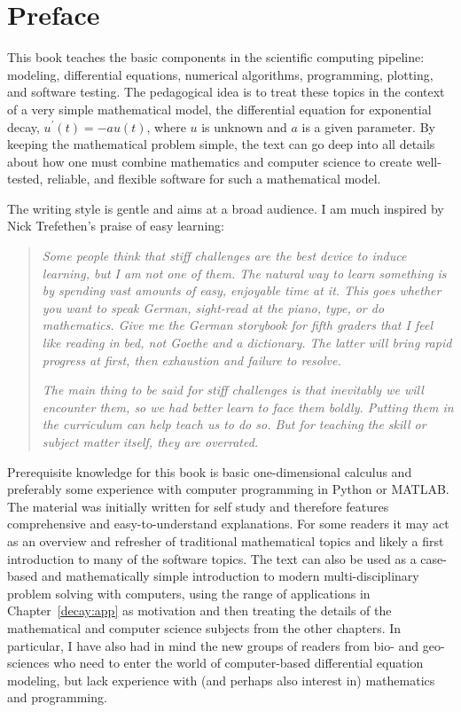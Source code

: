 \documentclass[graybox,sectrefs,envcountresetchap,open=right,final]{svmonodo}
\begin{document}
\setpagesize

\chapter*{Preface}
\label{ch:preface}

This book teaches the basic components in the scientific
computing pipeline: modeling, differential equations, numerical
algorithms, programming, plotting, and software testing. The pedagogical idea
is to treat these topics in the context of a very simple
mathematical model, the
differential equation for exponential decay, $u^{\prime}(t)=-au(t)$,
where $u$ is unknown and $a$ is a given parameter. By keeping the
mathematical problem simple, the text can go deep into all details
about how one must combine mathematics and computer science to
create well-tested, reliable, and flexible software for such a
mathematical model.

The writing style is gentle and aims at a broad audience. I am much
inspired by Nick Trefethen's praise of easy learning:


\begin{quote}
\emph{Some people think that stiff challenges are the best device to
induce learning, but I am not one of them. The natural way to learn
something is by spending vast amounts of easy, enjoyable time at it.
This goes whether you want to speak German, sight-read at the
piano, type, or do mathematics. Give me the German storybook for
fifth graders that I feel like reading in bed, not Goethe and a
dictionary. The latter will bring rapid progress at first, then
exhaustion and failure to resolve.}

\emph{The main thing to be said for stiff challenges is that inevitably
we will encounter them, so we had better learn to face them boldly.
Putting them in the curriculum can help teach us to do so. But for
teaching the skill or subject matter itself, they are overrated.}
\cite[p.~86]{index_cards}
\end{quote}


Prerequisite knowledge for this book is basic one-dimensional calculus
and preferably some experience with computer programming in Python or
MATLAB.  The material was initially written for self study and
therefore features comprehensive and easy-to-understand
explanations. For some readers it may act as an overview and refresher
of traditional mathematical topics and likely a first introduction to
many of the software topics. The text can also be used as a case-based
and mathematically simple introduction to modern multi-disciplinary
problem solving with computers, using the range of applications in
Chapter~\ref{decay:app} as motivation and then treating the details of
the mathematical and computer science subjects from the other
chapters. In particular, I have also had in mind the new groups of
readers from bio- and geo-sciences who need to enter the world of
computer-based differential equation modeling, but lack experience
with (and perhaps also interest in) mathematics and programming.
\end{document}
